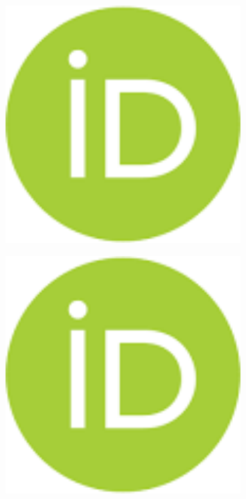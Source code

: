 \begin{figure}[H]
	\centering
	\includegraphics[width=0.8\textwidth]{media/ekon2/image6}
	\caption*{}
\end{figure}

\begin{figure}[H]
	\centering
	\includegraphics[width=0.8\textwidth]{media/ekon2/image6}
	\caption*{}
\end{figure}

